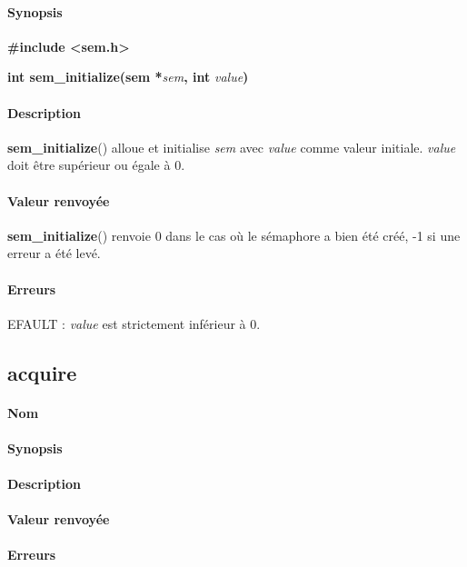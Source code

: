 \documentclass[12pt]{article}
\begin{document}
        \paragraph{Synopsis\\}
        \textbf{\#include <sem.h>}

        \textbf{int sem\_initialize(sem *}\textit{sem}\textbf{, int }\textit{value}\textbf{)}
        \paragraph{Description\\}
        \textbf{sem\_initialize}() alloue et initialise \textit{sem} avec \textit{value} comme valeur initiale. \textit{value} doit être supérieur ou égale à 0.

        \paragraph{Valeur renvoyée\\}
        \textbf{sem\_initialize}() renvoie 0 dans le cas où le sémaphore a bien été créé, -1 si une erreur a été levé.
        \paragraph{Erreurs\\}
        EFAULT : \textit{value} est strictement inférieur à 0.
    \newpage
    \subsection{acquire}
        \paragraph{Nom}
        \paragraph{Synopsis}
        \paragraph{Description}
        \paragraph{Valeur renvoyée}
        \paragraph{Erreurs}
\end{document}
